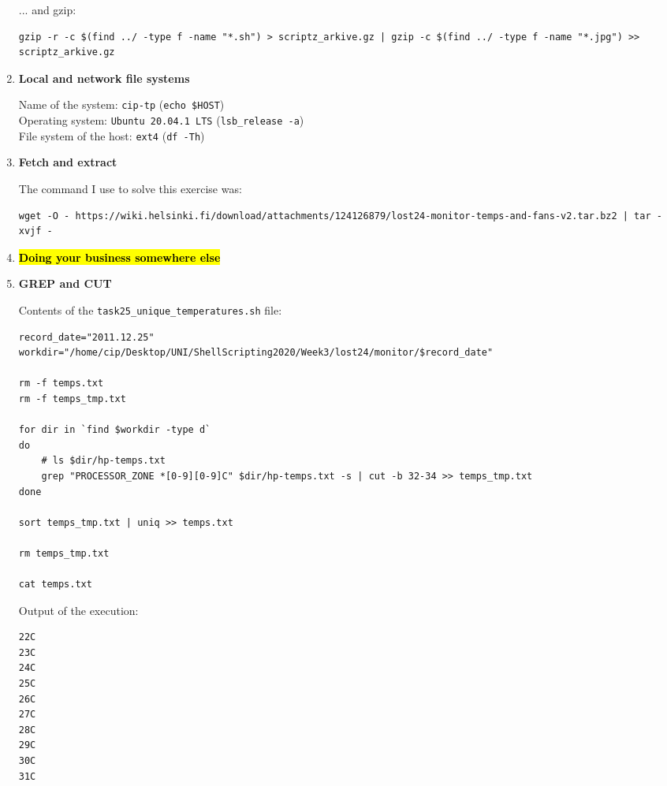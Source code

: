 \documentclass[9pt]{article}
\begin{document}
\begin{enumerate}
        ... and gzip:
        \begin{lstlisting}[breaklines=true]
gzip -r -c $(find ../ -type f -name "*.sh") > scriptz_arkive.gz | gzip -c $(find ../ -type f -name "*.jpg") >> scriptz_arkive.gz
        \end{lstlisting}

    \item \textbf{Local and network file systems}
    
        Name of the system: \texttt{cip-tp} (\texttt{echo \$HOST})\\
        Operating system: \texttt{Ubuntu 20.04.1 LTS} (\texttt{lsb\_release -a})\\
        File system of the host: \texttt{ext4} (\texttt{df -Th})
        
    \item \textbf{Fetch and extract}
        
        The command I use to solve this exercise was:
        \begin{lstlisting}[breaklines=true]
wget -O - https://wiki.helsinki.fi/download/attachments/124126879/lost24-monitor-temps-and-fans-v2.tar.bz2 | tar -xvjf -
        \end{lstlisting}

    \item \hl{\textbf{Doing your business somewhere else}}
    
    \item \textbf{GREP and CUT}

        Contents of the \texttt{task25\_unique\_temperatures.sh} file:
        \begin{lstlisting}[breaklines=true]
record_date="2011.12.25"
workdir="/home/cip/Desktop/UNI/ShellScripting2020/Week3/lost24/monitor/$record_date"

rm -f temps.txt
rm -f temps_tmp.txt

for dir in `find $workdir -type d`
do
    # ls $dir/hp-temps.txt
    grep "PROCESSOR_ZONE *[0-9][0-9]C" $dir/hp-temps.txt -s | cut -b 32-34 >> temps_tmp.txt
done

sort temps_tmp.txt | uniq >> temps.txt

rm temps_tmp.txt

cat temps.txt
        \end{lstlisting}

        Output of the execution:
        \begin{lstlisting}
22C
23C
24C
25C
26C
27C
28C
29C
30C
31C
        \end{lstlisting}


\end{enumerate}
\end{document}
